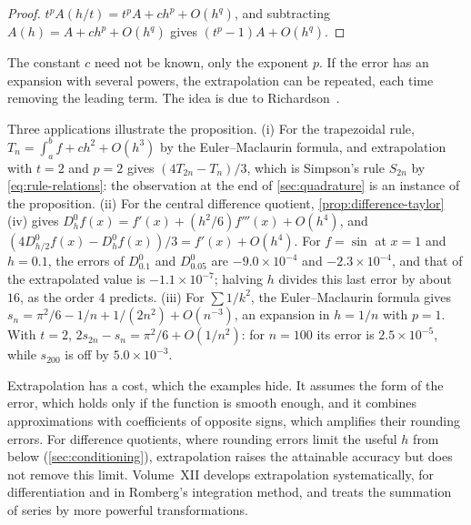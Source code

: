 \begin{proof}
$t^pA(h/t)=t^pA+ch^p+O(h^q)$, and subtracting $A(h)=A+ch^p+O(h^q)$ gives $(t^p-1)A+O(h^q)$.
\end{proof}

The constant $c$ need not be known, only the exponent $p$. If the error has an expansion with several powers, the extrapolation can be repeated, each time removing the leading term. The idea is due to Richardson~\cite{richardson1911}.

Three applications illustrate the proposition. (i) For the trapezoidal rule, $T_n=\int_a^bf+ch^2+O(h^3)$ by the Euler--Maclaurin formula, and extrapolation with $t=2$ and $p=2$ gives $(4T_{2n}-T_n)/3$, which is Simpson's rule $S_{2n}$ by \eqref{eq:rule-relations}: the observation at the end of \cref{sec:quadrature} is an instance of the proposition. (ii) For the central difference quotient, \cref{prop:difference-taylor}\,(iv) gives $D_h^0f(x)=f'(x)+(h^2/6)f'''(x)+O(h^4)$, and $(4D_{h/2}^0f(x)-D_h^0f(x))/3=f'(x)+O(h^4)$. For $f=\sin$ at $x=1$ and $h=0.1$, the errors of $D_{0.1}^0$ and $D_{0.05}^0$ are $-9.0\times10^{-4}$ and $-2.3\times10^{-4}$, and that of the extrapolated value is $-1.1\times10^{-7}$; halving $h$ divides this last error by about $16$, as the order $4$ predicts. (iii) For $\sum1/k^2$, the Euler--Maclaurin formula gives $s_n=\pi^2/6-1/n+1/(2n^2)+O(n^{-3})$, an expansion in $h=1/n$ with $p=1$. With $t=2$, $2s_{2n}-s_n=\pi^2/6+O(1/n^2)$: for $n=100$ its error is $2.5\times10^{-5}$, while $s_{200}$ is off by $5.0\times10^{-3}$.

Extrapolation has a cost, which the examples hide. It assumes the form of the error, which holds only if the function is smooth enough, and it combines approximations with coefficients of opposite signs, which amplifies their rounding errors. For difference quotients, where rounding errors limit the useful $h$ from below (\cref{sec:conditioning}), extrapolation raises the attainable accuracy but does not remove this limit. Volume~XII develops extrapolation systematically, for differentiation and in Romberg's integration method, and treats the summation of series by more powerful transformations.


